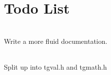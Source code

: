 \chapter{Todo List}
\hypertarget{todo}{}\label{todo}

\begin{DoxyRefList}
\item[File \doxylink{error_8h}{error.h} ]\hfill \\
\label{todo__todo000001}%
%
Write a more fluid documentation. 
\item[File \doxylink{math_8h}{math.h} ]\hfill \\
\label{todo__todo000002}%
%
Split up into tgval.\+h and tgmath.\+h 
\end{DoxyRefList}